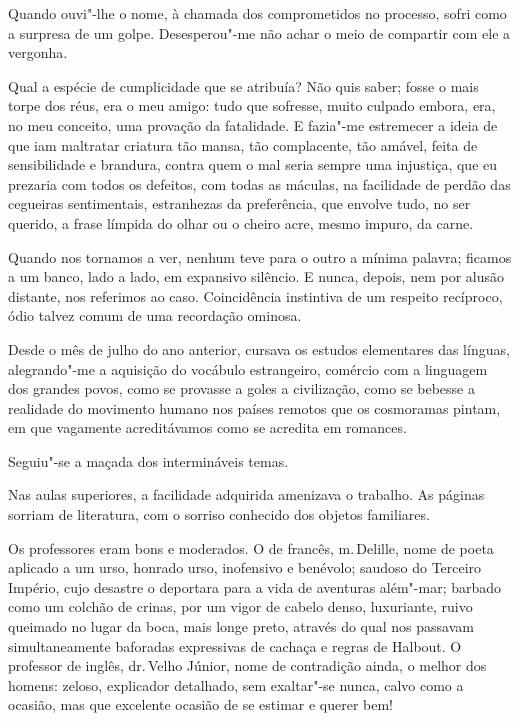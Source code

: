 Quando ouvi"-lhe o nome, à chamada dos
comprometidos no processo, sofri como a surpresa de um golpe.
Desesperou"-me não achar o meio de compartir com ele a vergonha. 

Qual a espécie de cumplicidade que se atribuía? Não quis saber; fosse o mais
torpe dos réus, era o meu amigo: tudo que sofresse, muito culpado
embora, era, no meu conceito, uma provação da fatalidade. E fazia"-me
estremecer a ideia de que iam maltratar criatura tão mansa, tão
complacente, tão amável, feita de sensibilidade e brandura, contra quem
o mal seria sempre uma injustiça, que eu prezaria com todos os
defeitos, com todas as máculas, na facilidade de perdão das cegueiras
sentimentais, estranhezas da preferência, que envolve tudo, no ser
querido, a frase límpida do olhar ou o cheiro acre, mesmo impuro, da
carne. 

Quando nos tornamos a ver, nenhum teve para o outro a mínima
palavra; ficamos a um banco, lado a lado, em expansivo silêncio. E
nunca, depois, nem por alusão distante, nos referimos ao caso.
Coincidência instintiva de um respeito recíproco, ódio talvez comum de
uma recordação ominosa. 

Desde o mês de julho do ano anterior, cursava
os estudos elementares das línguas, alegrando"-me a aquisição do
vocábulo estrangeiro, comércio com a linguagem dos grandes povos, como
se provasse a goles a civilização, como se bebesse a realidade do
movimento humano nos países remotos que os cosmoramas pintam, em que
vagamente acreditávamos como se acredita em romances. 

Seguiu"-se a maçada dos intermináveis temas. 

Nas aulas superiores, a facilidade
adquirida amenizava o trabalho. As páginas sorriam de literatura, com o
sorriso conhecido dos objetos familiares.

Os professores eram bons e moderados. O de francês, m.\,Delille, nome de
poeta aplicado a um urso, honrado urso, inofensivo e benévolo; saudoso
do Terceiro Império, cujo desastre o deportara para a vida de aventuras
além"-mar; barbado como um colchão de crinas, por um vigor de cabelo
denso, luxuriante, ruivo queimado no lugar da boca, mais longe preto,
através do qual nos passavam simultaneamente baforadas expressivas de
cachaça e regras de Halbout. O professor de inglês, dr.\,Velho Júnior,
nome de contradição ainda, o melhor dos homens: zeloso, explicador
detalhado, sem exaltar"-se nunca, calvo como a ocasião, mas que
excelente ocasião de se estimar e querer bem! 

